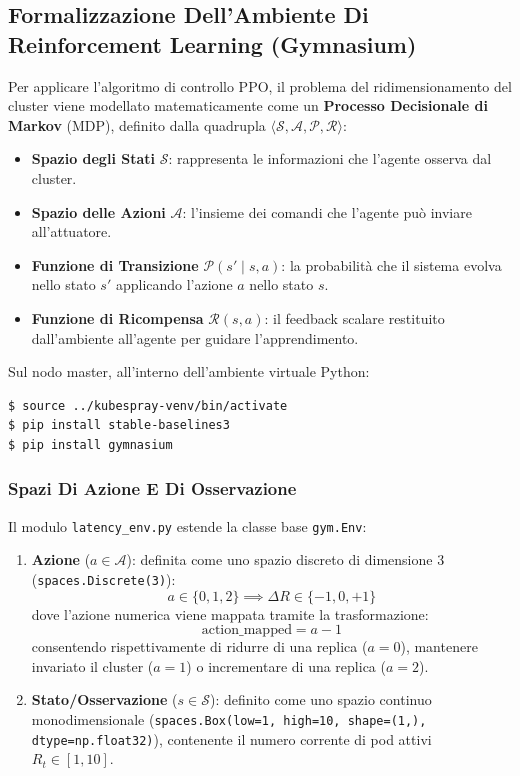 \documentclass[11pt, a4paper]{article}
\begin{document}
\subsection{Formalizzazione Dell'Ambiente Di Reinforcement Learning (Gymnasium)}

Per applicare l'algoritmo di controllo PPO, il problema del ridimensionamento del cluster viene modellato matematicamente come un \textbf{Processo Decisionale di Markov} (MDP), definito dalla quadrupla $\langle \mathcal{S}, \mathcal{A}, \mathcal{P}, \mathcal{R} \rangle$:
\begin{itemize}[noitemsep]
    \item \textbf{Spazio degli Stati} $\mathcal{S}$: rappresenta le informazioni che l'agente osserva dal cluster.
    \item \textbf{Spazio delle Azioni} $\mathcal{A}$: l'insieme dei comandi che l'agente può inviare all'attuatore.
    \item \textbf{Funzione di Transizione} $\mathcal{P}(s' \mid s, a)$: la probabilità che il sistema evolva nello stato $s'$ applicando l'azione $a$ nello stato $s$.
    \item \textbf{Funzione di Ricompensa} $\mathcal{R}(s, a)$: il feedback scalare restituito dall'ambiente all'agente per guidare l'apprendimento.
\end{itemize}

Sul nodo master, all'interno dell'ambiente virtuale Python:
\begin{lstlisting}[language=bash]
$ source ../kubespray-venv/bin/activate
$ pip install stable-baselines3
$ pip install gymnasium
\end{lstlisting}

\subsubsection{Spazi Di Azione E Di Osservazione}

Il modulo \texttt{latency\_env.py} estende la classe base \texttt{gym.Env}:
\begin{enumerate}[noitemsep]
    \item \textbf{Azione} ($a \in \mathcal{A}$): definita come uno spazio discreto di dimensione 3 (\texttt{spaces.Discrete(3)}):
    \[
    a \in \{0, 1, 2\} \implies \Delta R \in \{-1, 0, +1\}
    \]
    dove l'azione numerica viene mappata tramite la trasformazione:
    \[
    \text{action\_mapped} = a - 1
    \]
    consentendo rispettivamente di ridurre di una replica ($a=0$), mantenere invariato il cluster ($a=1$) o incrementare di una replica ($a=2$).

    \item \textbf{Stato/Osservazione} ($s \in \mathcal{S}$): definito come uno spazio continuo monodimensionale (\texttt{spaces.Box(low=1, high=10, shape=(1,), dtype=np.float32)}), contenente il numero corrente di pod attivi $R_t \in [1, 10]$.
\end{enumerate}
\end{document}
